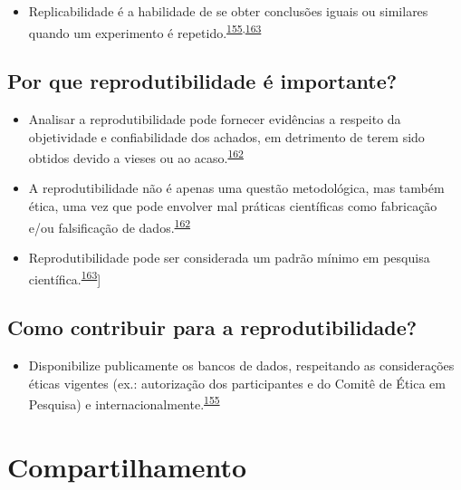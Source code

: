 \documentclass[
]{book}
\providecommand{\tightlist}{%
  \setlength{\itemsep}{0pt}\setlength{\parskip}{0pt}}
\begin{document}
\begin{itemize}
\tightlist
\item
  Replicabilidade é a habilidade de se obter conclusões iguais ou similares quando um experimento é repetido.\textsuperscript{\protect\hyperlink{ref-mair2016}{155},\protect\hyperlink{ref-hofner2015}{163}}
\end{itemize}

\hypertarget{por-que-reprodutibilidade-uxe9-importante}{%
\subsection{Por que reprodutibilidade é importante?}\label{por-que-reprodutibilidade-uxe9-importante}}

\begin{itemize}
\item
  Analisar a reprodutibilidade pode fornecer evidências a respeito da objetividade e confiabilidade dos achados, em detrimento de terem sido obtidos devido a vieses ou ao acaso.\textsuperscript{\protect\hyperlink{ref-resnik2016}{162}}
\item
  A reprodutibilidade não é apenas uma questão metodológica, mas também ética, uma vez que pode envolver mal práticas científicas como fabricação e/ou falsificação de dados.\textsuperscript{\protect\hyperlink{ref-resnik2016}{162}}
\item
  Reprodutibilidade pode ser considerada um padrão mínimo em pesquisa científica.\textsuperscript{\protect\hyperlink{ref-hofner2015}{163}}{]}
\end{itemize}

\hypertarget{como-contribuir-para-a-reprodutibilidade}{%
\subsection{Como contribuir para a reprodutibilidade?}\label{como-contribuir-para-a-reprodutibilidade}}

\begin{itemize}
\tightlist
\item
  Disponibilize publicamente os bancos de dados, respeitando as considerações éticas vigentes (ex.: autorização dos participantes e do Comitê de Ética em Pesquisa) e internacionalmente.\textsuperscript{\protect\hyperlink{ref-mair2016}{155}}
\end{itemize}

\hypertarget{compartilhamento}{%
\section{Compartilhamento}\label{compartilhamento}}
\end{document}
